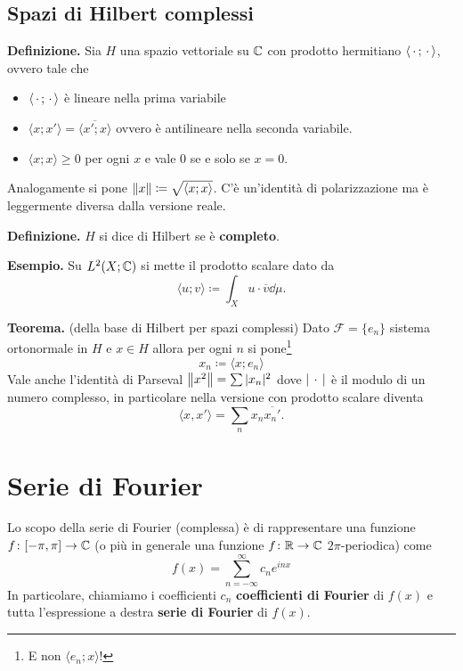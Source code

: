 %
%

\section{Spazi di Hilbert complessi}

\textbf{Definizione.}
Sia $H$ una spazio vettoriale su $\mathbb C$ con prodotto hermitiano $\langle\,\cdot\,; \,\cdot\,\rangle$, ovvero tale che
\begin{itemize}
	\item $\langle \,\cdot\,; \,\cdot\, \rangle$ è lineare nella prima variabile
	\item $\langle x; x' \rangle = \overline{\langle x'; x \rangle}$ ovvero è antilineare nella seconda variabile.
	\item $\langle x; x \rangle \geq 0$ per ogni $x$ e vale $0$ se e solo se $x = 0$.
\end{itemize}

Analogamente si pone $\left\lVert x \right\rVert \coloneqq \sqrt{\langle x; x \rangle}$. C'è un'identità di polarizzazione ma è leggermente diversa dalla versione reale.

\textbf{Definizione.} $H$ si dice di Hilbert se è \textbf{completo}.

\textbf{Esempio.}
Su $L^2(X; \mathbb C)$ si mette il prodotto scalare dato da
$$
\langle u; v \rangle \coloneqq \int_X u \cdot \overline v \dd \mu.
$$

\textbf{Teorema.} (della base di Hilbert per spazi complessi)
Dato $\mathcal F = \{ e_n \}$ sistema ortonormale in $H$ e $x \in H$ allora per ogni $n$ si pone\footnote{E non $\langle e_n; x \rangle$!}
$$
x_n \coloneqq \langle x; e_n \rangle
$$
Vale anche l'identità di Parseval $\left\lVert x^2 \right\rVert = \sum |x_n|^2$ dove $|\,\cdot\,|$ è il modulo di un numero complesso, in particolare nella versione con prodotto scalare diventa
$$
\langle x, x' \rangle = \sum_n x_n \overline{x_n'}.
$$


\chapter{Serie di Fourier}

Lo scopo della serie di Fourier (complessa) è di rappresentare una funzione $f \colon [-\pi, \pi] \to \mathbb C$ (o più in generale una funzione $f \colon \mathbb R \to \mathbb C$ $2\pi$-periodica) come
$$
f(x) = \sum_{n=-\infty}^\infty c_n e^{i n x}
$$
In particolare, chiamiamo i coefficienti $c_n$ \textbf{coefficienti di Fourier} di $f(x)$ e tutta l'espressione a destra \textbf{serie di Fourier} di $f(x)$.


